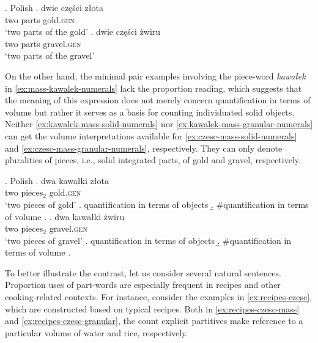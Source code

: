 \ex. Polish\label{ex:mass-czesc-numerals}
\ag. dwie części złota\label{ex:czesc-mass-solid-numerals}\\
  two parts gold\textsc{.gen}\\
  `two parts of the gold'
\bg. dwie części żwiru\label{ex:czesc-mass-granular-numerals}\\
  two parts gravel\textsc{.gen}\\
  `two parts of the gravel' 

On the other hand, the minimal pair examples involving the piece-word \textit{kawałek} in \ref{ex:mass-kawalek-numerals} lack the proportion reading, which suggests that the meaning of this expression does not merely concern quantification in terms of volume but rather it serves as a basis for counting individuated solid objects. Neither \ref{ex:kawalek-mass-solid-numerals} nor \ref{ex:kawalek-mass-granular-numerals} can get the volume interpretations available for \ref{ex:czesc-mass-solid-numerals} and \ref{ex:czesc-mass-granular-numerals}, respectively. They can only denote pluralities of pieces, i.e., solid integrated parts, of gold and gravel, respectively.\pagebreak

\ex. Polish\label{ex:mass-kawalek-numerals}
\ag. dwa kawałki złota\label{ex:kawalek-mass-solid-numerals}\\
  two pieces$_2$ gold\textsc{.gen}\\
  `two pieces of gold'
    \a. quantification in terms of objects
  \b. \#quantification in terms of volume
  \z.
\bg. dwa kawałki żwiru\label{ex:kawalek-mass-granular-numerals}\\
  two pieces$_2$ gravel\textsc{.gen}\\
  `two pieces of gravel'
  \a. quantification in terms of objects
  \b. \#quantification in terms of volume
  \z.

\begin{sloppypar}
To better illustrate the contrast, let us consider several natural sentences. Proportion uses of part-words are especially frequent in recipes and other cooking-related contexts. For instance, consider the examples in \ref{ex:recipes-czesc}, which are constructed based on typical recipes. Both in \ref{ex:recipes-czesc-mass} and \ref{ex:recipes-czesc-granular}, the count explicit partitives make reference to a particular volume of water and rice, respectively. 
\end{sloppypar}

